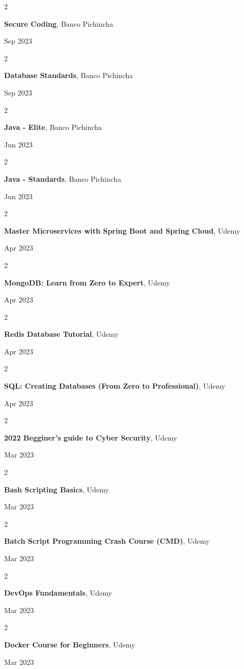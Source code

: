 \documentclass[10pt, letterpaper]{article}
\newenvironment{twocolentry}[2][]{
    \onecolentry
    \def\secondColumn{#2}
    \setcolumnwidth{\fill, 4.5 cm}
    \begin{paracol}{2}
}{
    \switchcolumn \raggedleft \secondColumn
    \end{paracol}
    \endonecolentry
} %
\begin{document}
    \begin{twocolentry}{
            Sep 2023
        }
        \textbf{Secure Coding}, Banco Pichincha
    \end{twocolentry}
    \begin{twocolentry}{
            Sep 2023
        }
        \textbf{Database Standards}, Banco Pichincha
    \end{twocolentry}
    \begin{twocolentry}{
            Jun 2023
        }
        \textbf{Java - Elite}, Banco Pichincha
    \end{twocolentry}
    \begin{twocolentry}{
            Jun 2023
        }
        \textbf{Java - Standards}, Banco Pichincha
    \end{twocolentry}
    \begin{twocolentry}{
            Apr 2023
        }
        \textbf{Master Microservices with Spring Boot and Spring Cloud}, Udemy
    \end{twocolentry}
    \begin{twocolentry}{
            Apr 2023
        }
        \textbf{MongoDB: Learn from Zero to Expert}, Udemy
    \end{twocolentry}
    \begin{twocolentry}{
            Apr 2023
        }
        \textbf{Redis Database Tutorial}, Udemy
    \end{twocolentry}
    \begin{twocolentry}{
            Apr 2023
        }
        \textbf{SQL: Creating Databases (From Zero to Professional)}, Udemy
    \end{twocolentry}
    \begin{twocolentry}{
            Mar 2023
        }
        \textbf{2022 Begginer’s guide to Cyber Security}, Udemy
    \end{twocolentry}
    \begin{twocolentry}{
            Mar 2023
        }
        \textbf{Bash Scripting Basics}, Udemy
    \end{twocolentry}
    \begin{twocolentry}{
            Mar 2023
        }
        \textbf{Batch Script Programming Crash Course (CMD)}, Udemy
    \end{twocolentry}
    \begin{twocolentry}{
            Mar 2023
        }
        \textbf{DevOps Fundamentals}, Udemy
    \end{twocolentry}
    \begin{twocolentry}{
            Mar 2023
        }
        \textbf{Docker Course for Beginners}, Udemy
    \end{twocolentry}
\end{document}

